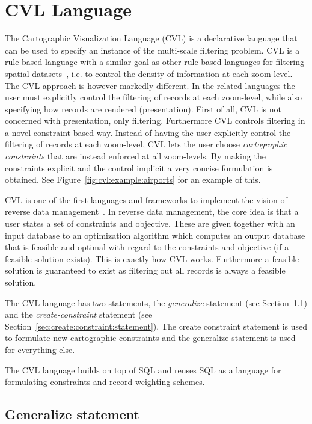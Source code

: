 \section{CVL Language}
\label{sec:cvl:language}
The Cartographic Visualization Language (CVL) is a declarative language that can be used to specify an instance of the multi-scale filtering problem. CVL is a rule-based language with a similar goal as other rule-based languages for filtering spatial datasets~\cite{sld,mapnik}, i.e. to control the density of information at each zoom-level. The CVL approach is however markedly different. In the related languages the user must explicitly control the filtering of records at each zoom-level, while also specifying how records are rendered (presentation). First of all, CVL is not concerned with presentation, only filtering. Furthermore CVL controls filtering in a novel constraint-based way. Instead of having the user explicitly control the filtering of records at each zoom-level, CVL lets the user choose \emph{cartographic constraints} that are instead enforced at all zoom-levels. By making the constraints explicit and the control implicit a very concise formulation is obtained. See Figure~\ref{fig:cvl:example:airports} for an example of this.

CVL is one of the first languages and frameworks to implement the vision of reverse data management~\cite{meliou2011reverse}. In reverse data management, the core idea is that a user states a set of constraints and objective. These are given together with an input database to an optimization algorithm which computes an output database that is feasible and optimal with regard to the constraints and objective (if a feasible solution exists). This is exactly how CVL works. Furthermore a feasible solution is guaranteed to exist as filtering out all records is always a feasible solution.

The CVL language has two statements, the \emph{generalize} statement (see Section~\ref{sec:generalize:statement}) and the \emph{create-constraint} statement (see Section~\ref{sec:create:constraint:statement}). The create constraint statement is used to formulate new cartographic constraints and the generalize statement is used for everything else. 

The CVL language builds on top of SQL and reuses SQL as a language for formulating constraints and record weighting schemes.

\subsection{Generalize statement}
\label{sec:generalize:statement}

